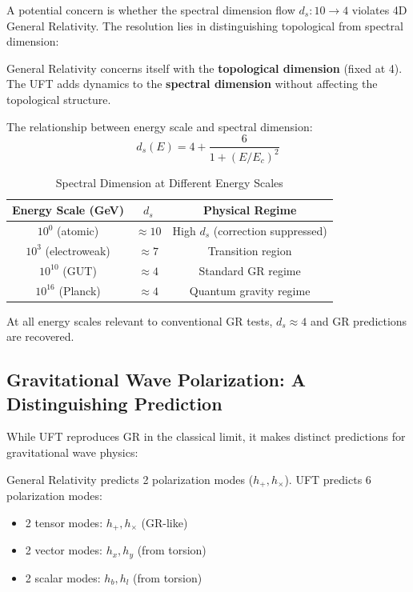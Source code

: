 A potential concern is whether the spectral dimension flow $d_s: 10 \to 4$ violates 4D General Relativity. The resolution lies in distinguishing topological from spectral dimension:

\begin{proposition}[GR Compatibility]
General Relativity concerns itself with the \textbf{topological dimension} (fixed at 4). The UFT adds dynamics to the \textbf{spectral dimension} without affecting the topological structure.
\end{proposition}

The relationship between energy scale and spectral dimension:
\begin{equation}
    d_s(E) = 4 + \frac{6}{1 + (E/E_c)^2}
    \label{eq:spectral_vs_energy}
\end{equation}

\begin{table}[htbp]
\centering
\caption{Spectral Dimension at Different Energy Scales}
\begin{tabular}{@{}ccc@{}}
\toprule
Energy Scale (GeV) & $d_s$ & Physical Regime \\
\midrule
$10^0$ (atomic) & $\approx 10$ & High $d_s$ (correction suppressed) \\
$10^3$ (electroweak) & $\approx 7$ & Transition region \\
$10^{10}$ (GUT) & $\approx 4$ & Standard GR regime \\
$10^{16}$ (Planck) & $\approx 4$ & Quantum gravity regime \\
\bottomrule
\end{tabular}
\label{tab:spectral_energy}
\end{table}

At all energy scales relevant to conventional GR tests, $d_s \approx 4$ and GR predictions are recovered.

\subsection{Gravitational Wave Polarization: A Distinguishing Prediction}

While UFT reproduces GR in the classical limit, it makes distinct predictions for gravitational wave physics:

\begin{theorem}
General Relativity predicts 2 polarization modes ($h_+, h_\times$). UFT predicts 6 polarization modes:
\begin{itemize}
    \item 2 tensor modes: $h_+, h_\times$ (GR-like)
    \item 2 vector modes: $h_x, h_y$ (from torsion)
    \item 2 scalar modes: $h_b, h_l$ (from torsion)
\end{itemize}
\end{theorem}

